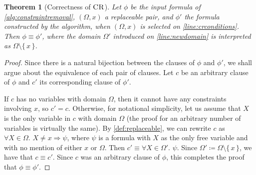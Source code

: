 \documentclass{article}
\newtheorem{theorem}{Theorem}
\DeclareMathOperator{\CR}{\textsc{CR}}
\begin{document}
\begin{theorem}[Correctness of $\CR$]
  Let $\phi$ be the input formula of \cref{alg:constraintremoval}, $(\Omega, x)$
  a replaceable pair, and $\phi'$ the formula constructed by the algorithm, when
  $(\Omega, x)$ is selected on \cref{line:crconditions}. Then
  $\phi \equiv \phi'$, where the domain $\Omega'$ introduced on
  \cref{line:newdomain} is interpreted as $\Omega \setminus \{\, x \,\}$.
\end{theorem}
\begin{proof}
  Since there is a natural bijection between the clauses of $\phi$ and $\phi'$,
  we shall argue about the equivalence of each pair of clauses. Let $c$ be an
  arbitrary clause of $\phi$ and $c'$ its corresponding clause of $\phi'$.

  If $c$ has no variables with domain $\Omega$, then it cannot have any
  constraints involving $x$, so $c' = c$. Otherwise, for notational simplicity,
  let us assume that $X$ is the only variable in $c$ with domain $\Omega$ (the
  proof for an arbitrary number of variables is virtually the same). By
  \cref{def:replaceable}, we can rewrite $c$ as $\forall X \in \Omega\text{.
  } X \ne x \Rightarrow \psi$, where $\psi$ is a formula with $X$ as the only free
  variable and with no mention of either $x$ or $\Omega$. Then
  $c' \equiv \forall X \in \Omega'\text{. } \psi$. Since
  $\Omega' \coloneqq \Omega \setminus \{\, x \,\}$, we have that $c \equiv c'$.
  Since $c$ was an arbitrary clause of $\phi$, this completes the proof that
  $\phi \equiv \phi'$.
\end{proof}
\end{document}
